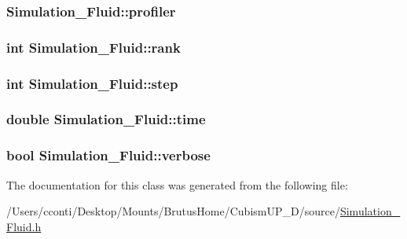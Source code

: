 \subsubsection[{profiler}]{ Simulation\+\_\+\+Fluid\+::profiler\hspace{0.3cm}{\ttfamily [protected]}}\label{class_simulation___fluid_a301b3bc8d7130dab2257cd2290584a7a}
\hypertarget{class_simulation___fluid_adaf54dc1ebc0dca54f5a2bf0a57297f4}{}
\subsubsection[{rank}]{\setlength{\rightskip}{0pt plus 5cm}int Simulation\+\_\+\+Fluid\+::rank\hspace{0.3cm}{\ttfamily [protected]}}\label{class_simulation___fluid_adaf54dc1ebc0dca54f5a2bf0a57297f4}
\hypertarget{class_simulation___fluid_a413104a68456556da195430ec33aa885}{}
\subsubsection[{step}]{\setlength{\rightskip}{0pt plus 5cm}int Simulation\+\_\+\+Fluid\+::step\hspace{0.3cm}{\ttfamily [protected]}}\label{class_simulation___fluid_a413104a68456556da195430ec33aa885}
\hypertarget{class_simulation___fluid_a743ea183f44eff7da35f693520f84bc8}{}
\subsubsection[{time}]{\setlength{\rightskip}{0pt plus 5cm}double Simulation\+\_\+\+Fluid\+::time\hspace{0.3cm}{\ttfamily [protected]}}\label{class_simulation___fluid_a743ea183f44eff7da35f693520f84bc8}
\hypertarget{class_simulation___fluid_a2524db7505eb9476800d34c3d6446def}{}
\subsubsection[{verbose}]{\setlength{\rightskip}{0pt plus 5cm}bool Simulation\+\_\+\+Fluid\+::verbose\hspace{0.3cm}{\ttfamily [protected]}}\label{class_simulation___fluid_a2524db7505eb9476800d34c3d6446def}


The documentation for this class was generated from the following file\+:\begin{DoxyCompactItemize}
\item 
/\+Users/cconti/\+Desktop/\+Mounts/\+Brutus\+Home/\+Cubism\+U\+P\+\_\+D/source/\hyperlink{_simulation___fluid_8h}{Simulation\+\_\+\+Fluid.\+h}\end{DoxyCompactItemize}
